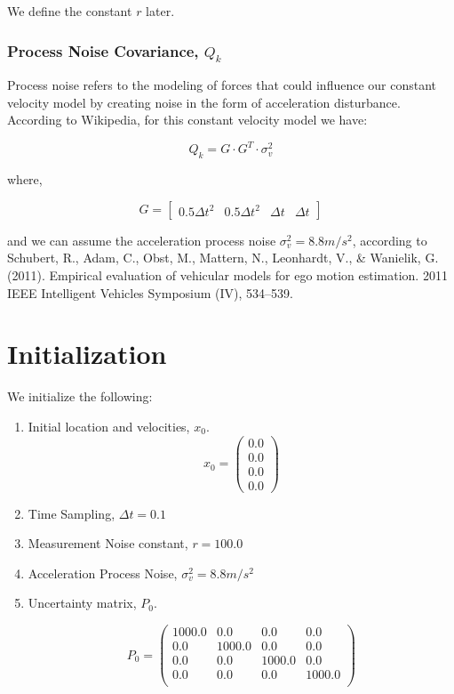 \documentclass{article}
\begin{document}
We define the constant $r$ later. 

\subsubsection{Process Noise Covariance, $Q_k$}
Process noise refers to the modeling of forces that could influence our constant velocity model by creating noise in the form of acceleration disturbance. According to Wikipedia, for this constant velocity model we have:

\[
Q_k = G \cdot G^T \cdot \sigma_v^2
\]

where,

\[ G = \left[ \begin{array}{cccc}
0.5\Delta t^2 & 0.5\Delta t^2 & \Delta t & \Delta t \end{array} \right]
\] 

and we can assume the acceleration process noise $\sigma_v^2 = 8.8 m/s^2$, according to Schubert, R., Adam, C., Obst, M., Mattern, N., Leonhardt, V., & Wanielik, G. (2011). Empirical evaluation of vehicular models for ego motion estimation. 2011 IEEE Intelligent Vehicles Symposium (IV), 534–539.


\section{Initialization}

We initialize the following:

\begin{enumerate}

\item Initial location and velocities, $x_0$.
\[ x_0 = \left( \begin{array}{c}
0.0\\
0.0\\
0.0\\
0.0 \end{array} \right)
\]

\item Time Sampling, $\Delta t = 0.1$
\item Measurement Noise constant, $r = 100.0$
\item Acceleration Process Noise, $\sigma_v^2 = 8.8 m/s^2$

\item Uncertainty matrix, $P_0$.

\[ P_0 = \left( \begin{array}{cccc}
1000.0 & 0.0 & 0.0 & 0.0\\
0.0 & 1000.0 & 0.0 & 0.0\\
0.0 & 0.0 & 1000.0 & 0.0\\
0.0 & 0.0 & 0.0 & 1000.0\\ \end{array} \right)
\]

\end{enumerate}
 
\end{document}
